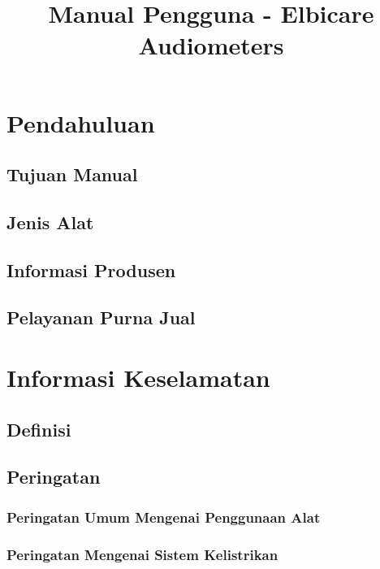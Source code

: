 \documentclass[11pt,a4paper,twoside,draft,onecolumn]{book}
\title{Manual Pengguna - Elbicare Audiometers}
\begin{document}
	\maketitle
	\renewcommand\contentsname{Daftar Isi}
	\tableofcontents
	
	\renewcommand\listfigurename{Daftar Gambar}
	\listoffigures
	
	\renewcommand\listtablename{Daftar Tabel}
	\listoftables
	\newpage
	
	\renewcommand\chaptername{Bab}
	
	\chapter{Pendahuluan}
	\section{Tujuan Manual}
	\section{Jenis Alat}
	\section{Informasi Produsen}
	\section{Pelayanan Purna Jual}
	\newpage
	
	\chapter{Informasi Keselamatan}
	\section{Definisi}
	\section{Peringatan}
	\subsection{Peringatan Umum Mengenai Penggunaan Alat}
	\subsection{Peringatan Mengenai Sistem Kelistrikan}
\end{document}
